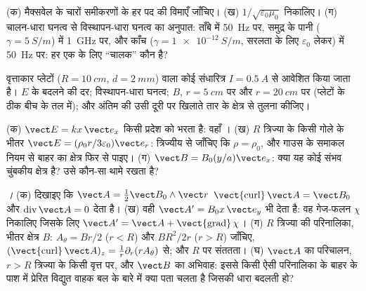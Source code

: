 \begin{exercise}[$\star$]\label{exo:b2:maxwell-equations:2}
(क) मैक्सवेल के चारों समीकरणों के हर पद की विमाएँ जाँचिए।
(ख) $1/\sqrt{\varepsilon_0\mu_0}$ निकालिए। (ग) चालन-धारा घनत्व से विस्थापन-धारा
घनत्व का अनुपात: ताँबे में \qty{50}{Hz} पर,
समुद्र के पानी ($\gamma = \qty{5}{S/m}$) में \qty{1}{GHz} पर, और काँच ($\gamma =
\qty{1e-12}{S/m}$, सरलता के लिए $\varepsilon_0$ लेकर) में \qty{50}{Hz} पर: हर एक के लिए
``चालक'' कौन है?
\end{exercise}

\begin{exercise}[$\star$]\label{exo:b2:maxwell-equations:3}
वृत्ताकार प्लेटों ($R = \qty{10}{cm}$, $d = \qty{2}{mm}$) वाला कोई संधारित्र
$I = \qty{0.5}{A}$ से आवेशित किया जाता है। $E$ के बदलने की दर; विस्थापन-धारा
घनत्व; $B$, $r = \qty{5}{cm}$ पर और $r = \qty{20}{cm}$ पर (प्लेटों के ठीक बीच के
तल में); और अंतिम की उसी दूरी पर खिलाते तार के क्षेत्र से
तुलना कीजिए।
\end{exercise}

\begin{exercise}[$\star$]\label{exo:b2:maxwell-equations:4}
(क) $\vect E = kx\,\vect e_x$ किसी प्रदेश को भरता है: वहाँ । (ख)
$R$ त्रिज्या के किसी गोले के भीतर $\vect E = (\rho_0r/3\varepsilon_0)\vect e_r$:
त्रिज्यीय  से जाँचिए कि $\rho = \rho_0$, और गाउस के समाकल नियम से बाहर का
क्षेत्र फिर से पाइए। (ग) $\vect B = B_0(y/a)\vect e_x$: क्या यह कोई संभव
चुंबकीय क्षेत्र है? उसे कौन-सा  थामे रखता है?
\end{exercise}

\begin{exercise}[$\star\star$]\label{exo:b2:maxwell-equations:5}
\emph{।} (क) दिखाइए कि $\vect A = \tfrac12\vect B_0\wedge\vect r$
$\operatorname{\vect{curl}}\vect A = \vect B_0$ और $\operatorname{div}\vect A = 0$ देता है।
(ख) वही $\vect A' = B_0x\,\vect e_y$ भी देता है: वह गेज-फलन $\chi$ निकालिए जिसके लिए
$\vect A' = \vect A + \operatorname{\vect{grad}}\chi$। (ग) $R$ त्रिज्या की परिनालिका,
भीतर क्षेत्र $B$: $A_\theta = Br/2$ ($r < R$) और $BR^2/2r$ ($r > R$) जाँचिए,
$(\operatorname{\vect{curl}}\vect A)_z = \frac1r\partial_r(rA_\theta)$ से; और $R$ पर संततता।
(घ) $\vect A$ का परिचालन, $r > R$ त्रिज्या के किसी वृत्त पर, और
$\vect B$ का अभिवाह: इससे किसी ऐसी परिनालिका के बाहर के पाश में प्रेरित विद्युत वाहक बल के बारे में क्या
पता चलता है जिसकी धारा बदलती हो?
\end{exercise}

